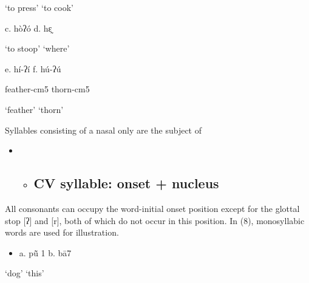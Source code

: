 \begin{styleindexi}
                ‘to press’                               ‘to cook’
\end{styleindexi}

\begin{styleindexi}
            c.   hòʔó                                 d.  hɛ̰               
\end{styleindexi}

\begin{styleindexi}
                ‘to stoop’                                ‘where’
\end{styleindexi}

\begin{styleindexi}
            e.  hí-ʔí                                f.   hú-ʔú            
\end{styleindexi}

\begin{styleindexi}
                feather-cm5                          thorn-cm5    
\end{styleindexi}

\begin{styleindexi}
                ‘feather’                                ‘thorn’
\end{styleindexi}

Syllables consisting of a nasal only are the subject of 

\begin{itemize}
\item \begin{itemize}
\item \subsection{ CV syllable: onset + nucleus} \end{itemize}
\end{itemize}

All consonants can occupy the word-initial onset position except for the glottal stop [ʔ] and [r], both of which do not occur in this position. In (8), monosyllabic words are used for illustration.

\begin{itemize}
\item \begin{styleindexi}
      a.  \label{bkm:Ref359767009}pũ\={} 1                                              b.  bā7                  
\end{styleindexi}\end{itemize}
\begin{styleindexi}
                ‘dog’                                                ‘this’                    
\end{styleindexi}

